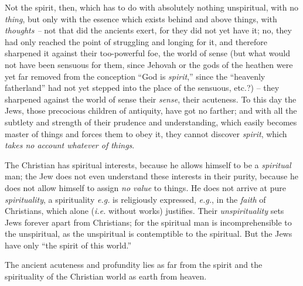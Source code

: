 Not the spirit, then, which has to do with absolutely nothing unspiritual, 
with no \textit{thing}, but only with the essence which exists behind and 
above things, with \textit{thoughts --} not that did the ancients exert, for 
they did not yet have it; no, they had only reached the point of struggling 
and longing for it, and therefore sharpened it against their too-powerful foe, 
the world of sense (but what would not have been sensuous for them, since 
Jehovah or the gods of the heathen were yet far removed from the conception 
``God is \textit{spirit},'' since the ``heavenly fatherland'' had not yet 
stepped into the place of the sensuous, etc.?) -- they sharpened against the 
world of sense their \textit{sense}, their acuteness. To this day the Jews, 
those precocious children of antiquity, have got no farther; and with all the 
subtlety and strength of their prudence and understanding, which easily 
becomes master of things and forces them to obey it, they cannot discover 
\textit{spirit}, which \textit{takes no account whatever of things}.

The Christian has spiritual interests, because he allows himself to be a 
\textit{spiritual} man; the Jew does not even understand these interests in 
their purity, because he does not allow himself to assign \textit{no value} to 
things. He does not arrive at pure \textit{spirituality}, a spirituality 
\textit{e.g.} is religiously expressed, \textit{e.g.}, in the \textit{faith} 
of Christians, which alone (\textit{i.e.} without works) justifies. Their 
\textit{unspirituality} sets Jews forever apart from Christians; for the 
spiritual man is incomprehensible to the unspiritual, as the unspiritual is 
contemptible to the spiritual. But the Jews have only ``the spirit of this 
world.''

The ancient acuteness and profundity lies as far from the spirit and the 
spirituality of the Christian world as earth from heaven.

